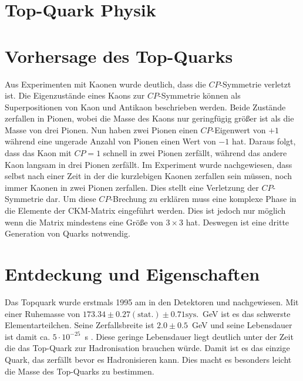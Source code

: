 \section{Top-Quark Physik}
\section{Vorhersage des Top-Quarks}
Aus Experimenten mit Kaonen wurde deutlich, dass die $CP$-Symmetrie verletzt ist. Die Eigenzustände eines Kaons zur $CP$-Symmetrie können als Superpositionen von Kaon und Antikaon beschrieben werden. Beide Zustände zerfallen in Pionen, wobei die Masse des Kaons nur geringfügig größer ist als die Masse von drei Pionen. Nun haben zwei Pionen einen $CP$-Eigenwert von $+1$ während eine ungerade Anzahl von Pionen einen Wert von $-1$ hat. Daraus folgt, dass das Kaon mit $CP=1$ schnell in zwei Pionen zerfällt, während
 das andere Kaon langsam in drei Pionen zerfällt. Im Experiment wurde nachgewiesen, dass selbst nach einer Zeit in der die kurzlebigen Kaonen zerfallen sein müssen, noch immer Kaonen in zwei Pionen zerfallen. Dies stellt eine Verletzung der $CP$-Symmetrie dar. Um diese $CP$-Brechung zu erklären muss eine komplexe Phase in die Elemente der CKM-Matrix eingeführt werden. Dies ist jedoch nur möglich wenn die Matrix mindestens eine Größe von $3\times 3$ hat. Deswegen ist eine dritte Generation von Quarks notwendig.
 
 \section{Entdeckung und Eigenschaften}
 Das Topquark wurde erstmals 1995 am \tevatron in den Detektoren \dzero und \cdf nachgewiesen. Mit einer Ruhemasse von $173.34 \pm 0.27(\text{stat.}) \pm 0.71 \text{sys.}$~GeV ist es das schwerste Elementarteilchen. Seine Zerfallsbreite ist $2.0\pm0.5$~GeV und seine Lebensdauer ist damit ca. $5\cdot10^{-25}$~s . Diese geringe Lebensdauer liegt deutlich unter der Zeit die das Top-Quark zur Hadronisation brauchen würde. Damit ist es das einzige Quark, das zerfällt bevor es Hadronisieren kann. Dies macht es besonders leicht die Masse des Top-Quarks zu bestimmen.
 

